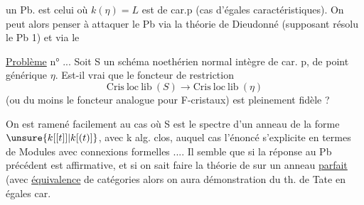 un Pb. est celui où $k(\eta)=L$ est de car.p (cas d'égales caractéristiques). On peut alors penser à attaquer le Pb via la théorie de Dieudonné (supposant résolu le Pb 1) et via le

\uline{Problème} n° ... Soit S un schéma noethérien normal  intègre de car. p, de point générique $\eta$. Est-il vrai que le foncteur de restriction
\[
\mathrm{Cris\ loc\ lib}\ (S)\longrightarrow\mathrm{Cris\ loc\ lib}\ (\eta)
\]
(ou du moins le foncteur analogue pour F-cristaux) est pleinement fidèle ?

On est ramené facilement au cas où S est le spectre d'un anneau de la forme $\unsure{k[[t]]|k[(t)]}$, avec k alg. clos, auquel cas l'énoncé s'explicite en termes de Modules avec connexions formelles .... Il semble que si la réponse au Pb précédent est affirmative,  et si on sait faire la théorie de  sur un anneau \uline{parfait} (avec \uline{équivalence} de catégories alors on aura démonstration du th. de Tate en égales car.

